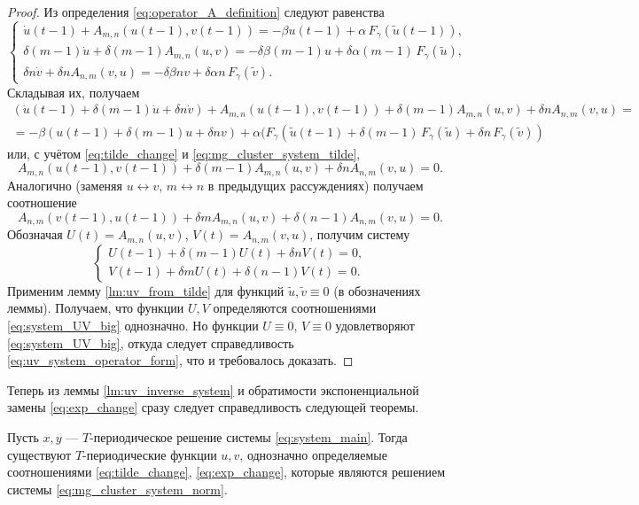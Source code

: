 \begin{proof}
	Из определения \eqref{eq:operator_A_definition} следуют равенства
	\[
	\begin{cases}
		\dot{u}(t - 1) + A_{m, n}(u(t - 1), v(t - 1))  = -\beta u(t - 1) + \alpha \, F_{\gamma}(\tilde{u}(t - 1)),\\
		\delta (m - 1)\dot{u} + \delta (m - 1) A_{m, n}(u, v)  = -\delta \beta (m - 1) u + \delta \alpha (m - 1) \, F_{\gamma}(\tilde{u}),\\
		\delta n \dot{v} + \delta n A_{n, m}(v, u)  = -\delta \beta n v + \delta \alpha n \, F_{\gamma}(\tilde{v}).
	\end{cases}
	\]
	Складывая их, получаем
	\small
	\begin{multline*}   
		(\dot{u}(t - 1) + \delta (m - 1)\dot{u} + \delta n\dot{v}) + A_{m, n}(u(t - 1), v(t - 1)) + \delta (m - 1) A_{m, n}(u, v) + \delta n A_{n, m}(v, u) =\\= -\beta(u(t - 1) + \delta (m - 1) u + \delta n v) + \alpha(F_{\gamma}(\tilde{u}(t - 1) + \delta (m - 1) \, F_{\gamma}(\tilde{u}) + \delta n \, F_{\gamma}(\tilde{v}))
	\end{multline*}
	\normalsize
	или, с учётом \eqref{eq:tilde_change} и \eqref{eq:mg_cluster_system_tilde},
	\[
	A_{m, n}(u(t - 1), v(t - 1)) + \delta (m - 1) A_{m, n}(u, v) + \delta n A_{n, m}(v, u) = 0.
	\]
	Аналогично (заменяя $u \leftrightarrow v$, $m \leftrightarrow n$ в предыдущих рассуждениях) получаем соотношение
	\[
	A_{n, m}(v(t - 1), u(t - 1)) + \delta m A_{m, n}(u, v) + \delta (n - 1) A_{n, m}(v, u) = 0.
	\]
	Обозначая $U(t) = A_{m, n}(u, v)$, $V(t) = A_{n, m}(v, u)$, получим систему
	\begin{equation}
		\label{eq:system_UV_big}
		\begin{cases}
			U(t - 1) + \delta (m - 1)U(t) + \delta n V(t) = 0,\\
			V(t - 1) + \delta m U(t) + \delta (n - 1) V(t) = 0.
		\end{cases}
	\end{equation}
	Применим лемму \ref{lm:uv_from_tilde} для функций $\tilde{u}, \tilde{v} \equiv 0$ (в обозначениях леммы). Получаем, что функции $U, V$ определяются соотношениями \eqref{eq:system_UV_big} однозначно. Но функции $U \equiv 0$, $V \equiv 0$ удовлетворяют \eqref{eq:system_UV_big}, откуда следует справедливость \eqref{eq:uv_system_operator_form}, что и требовалось доказать.
\end{proof}

Теперь из леммы \ref{lm:uv_inverse_system} и обратимости экспоненциальной замены \eqref{eq:exp_change} сразу следует справедливость следующей теоремы.
\begin{theorem}
	Пусть $x, y$ --- $T$-периодическое решение системы \eqref{eq:system_main}. Тогда существуют $T$-периодические функции $u, v$, однозначно определяемые соотношениями \eqref{eq:tilde_change}, \eqref{eq:exp_change}, которые являются решением системы \eqref{eq:mg_cluster_system_norm}.
\end{theorem}


